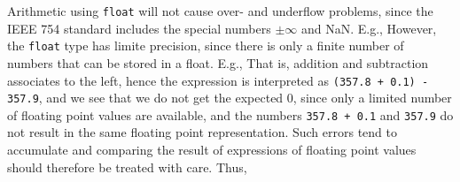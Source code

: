 


Arithmetic using \lstinline|float| will not cause over- and underflow problems, since the IEEE 754 standard includes the special numbers $\pm\infty$ and NaN. E.g.,
%
%
%
However, the \lstinline|float| type has limite precision, since there is only a finite number of numbers that can be stored in a float. E.g.,
%
%
%
That is, addition and subtraction associates to the left, hence the expression is interpreted as \lstinline!(357.8 + 0.1) - 357.9!, and we see that we do not get the expected 0, since only a limited number of floating point values are available, and the numbers \lstinline!357.8 + 0.1!  and \lstinline!357.9! do not result in the same floating point representation. Such errors tend to accumulate and comparing the result of expressions of floating point values should therefore be treated with care. Thus, 

